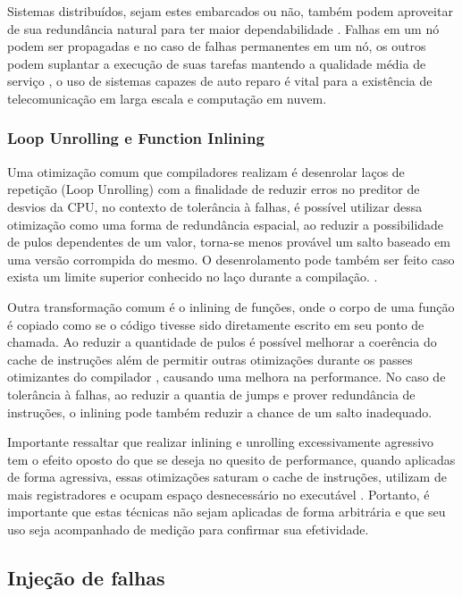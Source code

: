 Sistemas distribuídos, sejam estes embarcados ou não, também podem aproveitar de sua redundância natural para ter maior dependabilidade \cite{MakingReliableDistSystems}. Falhas em um nó podem ser propagadas e no caso de falhas permanentes em um nó, os outros podem suplantar a execução de suas tarefas mantendo a qualidade média de serviço \cite{MakingReliableDistSystems} \cite{SchedAndOptOfDistributedFT}, o uso de sistemas capazes de auto reparo é vital para a existência de telecomunicação em larga escala e computação em nuvem.

\subsubsection{Loop Unrolling e Function Inlining}

Uma otimização comum que compiladores realizam é desenrolar laços de repetição (Loop Unrolling) com a finalidade de reduzir erros no preditor de desvios da CPU, no contexto de tolerância à falhas, é possível utilizar dessa otimização como uma forma de redundância espacial, ao reduzir a possibilidade de pulos dependentes de um valor, torna-se menos provável um salto baseado em uma versão corrompida do mesmo. O desenrolamento pode também ser feito caso exista um limite superior conhecido no laço durante a compilação. \cite{LoopUnrollingARM}.

Outra transformação comum é o inlining de funções, onde o corpo de uma função é copiado como se o código tivesse sido diretamente escrito em seu ponto de chamada. Ao reduzir a quantidade de pulos é possível melhorar a coerência do cache de instruções além de permitir outras otimizações durante os passes otimizantes do compilador \cite{EngineeringACompiler}, causando uma melhora na performance. No caso de tolerância à falhas, ao reduzir a quantia de jumps e prover redundância de instruções, o inlining pode também reduzir a chance de um salto inadequado. %

Importante ressaltar que realizar inlining e unrolling excessivamente agressivo tem o efeito oposto do que se deseja no quesito de performance, quando aplicadas de forma agressiva, essas otimizações saturam o cache de instruções, utilizam de mais registradores e ocupam espaço desnecessário no executável \cite{EngineeringACompiler}. Portanto, é importante que estas técnicas não sejam aplicadas de forma arbitrária e que seu uso seja acompanhado de medição para confirmar sua efetividade.

\subsection{Injeção de falhas}


